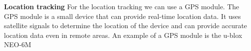 \textbf{Location tracking}
For the location tracking we can use a GPS module. The GPS module is a small device that can provide real-time location data. It uses satellite signals to determine the location of the device and can provide accurate location data even in remote areas. An example of a GPS module is the u-blox NEO-6M

